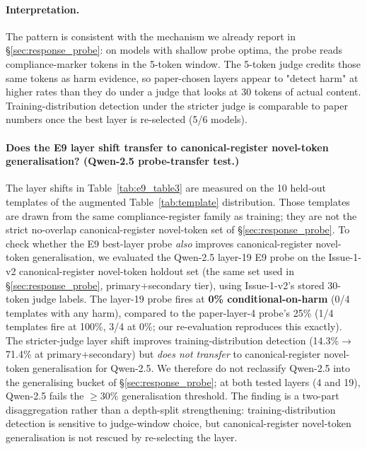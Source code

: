 \documentclass{article}
\begin{document}
\paragraph{Interpretation.} The pattern is consistent with the mechanism we already report in \S\ref{sec:response_probe}: on models with shallow probe optima, the probe reads compliance-marker tokens in the 5-token window. The 5-token judge credits those same tokens as harm evidence, so paper-chosen layers appear to "detect harm" at higher rates than they do under a judge that looks at 30 tokens of actual content. Training-distribution detection under the stricter judge is comparable to paper numbers once the best layer is re-selected (5/6 models).

\paragraph{Does the E9 layer shift transfer to canonical-register novel-token generalisation? (Qwen-2.5 probe-transfer test.)} The layer shifts in Table~\ref{tab:e9_table3} are measured on the 10 held-out templates of the augmented Table~\ref{tab:template} distribution. Those templates are drawn from the same compliance-register family as training; they are not the strict no-overlap canonical-register novel-token set of \S\ref{sec:response_probe}. To check whether the E9 best-layer probe \emph{also} improves canonical-register novel-token generalisation, we evaluated the Qwen-2.5 layer-19 E9 probe on the Issue-1-v2 canonical-register novel-token holdout set (the same set used in \S\ref{sec:response_probe}, primary+secondary tier), using Issue-1-v2's stored 30-token judge labels. The layer-19 probe fires at \textbf{0\% conditional-on-harm} (0/4 templates with any harm), compared to the paper-layer-4 probe's 25\% (1/4 templates fire at 100\%, 3/4 at 0\%; our re-evaluation reproduces this exactly). The stricter-judge layer shift improves training-distribution detection (14.3\%$\to$71.4\% at primary+secondary) but \emph{does not transfer} to canonical-register novel-token generalisation for Qwen-2.5. We therefore do not reclassify Qwen-2.5 into the generalising bucket of \S\ref{sec:response_probe}; at both tested layers (4 and 19), Qwen-2.5 fails the $\geq 30\%$ generalisation threshold. The finding is a two-part disaggregation rather than a depth-split strengthening: training-distribution detection is sensitive to judge-window choice, but canonical-register novel-token generalisation is not rescued by re-selecting the layer.
\end{document}
